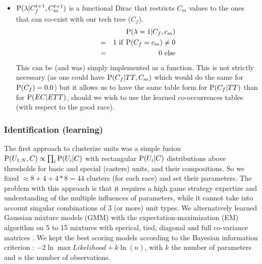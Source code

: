 \begin{itemize}

\item $\mathrm{P}(\lambda | C_f^{t+1},C_m^{t+1})$ is a functional Dirac that restricts $C_m$ values to the ones that can co-exist with our tech tree ($C_f$).
\begin{eqnarray*}
& & \mathrm{P}(\lambda = 1 | C_f, c_m) \\
& = & 1\ \mathrm{if\ } \mathrm{P}(C_f=c_m) \neq 0\\
& = & 0\ \mathrm{else}
\end{eqnarray*}
This can be (and was) simply implemented as a function. This is not strictly necessary (as one could have $\mathrm{P}(C_f|TT,C_m)$ which would do the same for $\mathrm{P}(C_f)=0.0$) but it allows us to have the same table form for $\mathrm{P}(C_f|TT)$ than for $\mathrm{P}(EC|ETT)$, should we wish to use the learned co-occurrences tables (with respect to the good race).

\end{itemize}

\subsubsection{Identification (learning)}
The first approach to clusterize units was a simple fusion $\mathrm{P}(U_{1:N},C)\propto \prod_i \mathrm{P}(U_i|C)$ with rectangular $\mathrm{P}(U_i|C)$ distributions above thresholds for basic and special (casters) units, and their compositions. So we fixed $\approx 8+4+4*8 = 44$ clusters (for each race) and set their parameters. The problem with this approach is that it requires a high game strategy expertize and understanding of the multiple influences of parameters, while it cannot take into account singular combinations of 3 (or more) unit types. We alternatively learned Gaussian mixture models (GMM) with the expectation-maximization (EM) algorithm on 5 to 15 mixtures with sperical, tied, diagonal and full co-variance matrices \cite{scikit-learn}. We kept the best scoring models according to the Bayesian information criterion \cite{schwarz1978}: $-2 \ln{\max{Likelihood}} + k \ln(n)$, with $k$ the number of parameters and $n$ the number of observations. %


